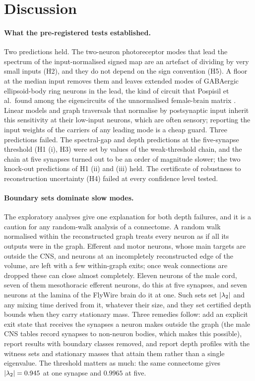 \section{Discussion}\label{sec:discussion}

\paragraph{What the pre-registered tests established.}
Two predictions held. The two-neuron photoreceptor modes that lead the spectrum of the
input-normalised signed map are an artefact of dividing by very small inputs (H2), and they do not
depend on the sign convention (H5). A floor at the median input removes them and leaves extended
modes of GABAergic ellipsoid-body ring neurons in the lead, the kind of circuit that Pospisil et al.\
found among the eigencircuits of the unnormalised female-brain matrix \cite{pospisil2024}. Linear
models and graph traversals that normalise by postsynaptic input \cite{schlegel2021,bates2026}
inherit this sensitivity at
their low-input neurons, which are often sensory; reporting the input weights of the carriers of any
leading mode is a cheap guard. Three predictions failed. The spectral-gap and depth predictions at
the five-synapse threshold (H1 (i), H3) were set by values of the weak-threshold chain, and the chain
at five synapses turned out to be an order of magnitude slower; the two knock-out predictions of
H1 (ii) and (iii) held. The certificate of robustness to reconstruction uncertainty
(H4) failed at every confidence level tested.

\paragraph{Boundary sets dominate slow modes.}
The exploratory analyses give one explanation for both depth failures, and it is a caution for any
random-walk analysis of a connectome. A random walk normalised within the reconstructed graph
treats every neuron as if all its outputs were in the graph. Efferent and motor neurons, whose main
targets are outside the CNS, and neurons at an incompletely reconstructed edge of the volume, are
left with a few within-graph exits; once weak connections are dropped these can close almost
completely. Eleven neurons of the male cord, seven of them mesothoracic efferent neurons, do this
at five synapses, and seven neurons at the lamina of the FlyWire brain do it at one. Such sets set $\lvert\lambda_2\rvert$ and any mixing time derived
from it, whatever their size, and they set certified depth bounds when they carry stationary mass.
Three remedies follow: add an explicit exit state that receives the synapses a neuron makes outside
the graph (the male CNS tables record synapses to non-neuron bodies, which makes this possible),
report results with boundary classes removed, and report depth profiles with the witness sets and
stationary masses that attain them rather than a single eigenvalue. The threshold matters as much:
the same connectome gives $\lvert\lambda_2\rvert=0.945$ at one synapse and $0.9965$ at five.

